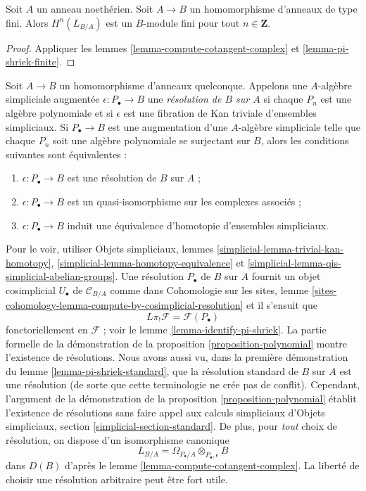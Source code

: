 \begin{lemma}
\label{lemma-cotangent-finite}
Soit $A$ un anneau noethérien. Soit $A \to B$ un homomorphisme d'anneaux de
type fini. Alors $H^n(L_{B/A})$ est un $B$-module fini pour tout
$n \in \mathbf{Z}$.
\end{lemma}

\begin{proof}
Appliquer les lemmes \ref{lemma-compute-cotangent-complex} et
\ref{lemma-pi-shriek-finite}.
\end{proof}

\begin{remark}[Resolutions]
\label{remark-resolution}
Soit $A \to B$ un homomorphisme d'anneaux quelconque. Appelons une
$A$-algèbre simpliciale augmentée $\epsilon : P_\bullet \to B$ une
{\it résolution de $B$ sur $A$} si chaque $P_n$ est une algèbre polynomiale
et si $\epsilon$ est une fibration de Kan triviale d'ensembles simpliciaux.
Si $P_\bullet \to B$ est une augmentation d'une $A$-algèbre simpliciale telle
que chaque $P_n$ soit une algèbre polynomiale se surjectant sur $B$, alors les
conditions suivantes sont équivalentes :
\begin{enumerate}
\item $\epsilon : P_\bullet \to B$ est une résolution de $B$ sur $A$ ;
\item $\epsilon : P_\bullet \to B$ est un quasi-isomorphisme sur les
complexes associés ;
\item $\epsilon : P_\bullet \to B$ induit une équivalence d'homotopie
d'ensembles simpliciaux.
\end{enumerate}
Pour le voir, utiliser Objets simpliciaux, lemmes
\ref{simplicial-lemma-trivial-kan-homotopy},
\ref{simplicial-lemma-homotopy-equivalence} et
\ref{simplicial-lemma-qis-simplicial-abelian-groups}.
Une résolution $P_\bullet$ de $B$ sur $A$ fournit un objet cosimplicial
$U_\bullet$ de $\mathcal{C}_{B/A}$ comme dans Cohomologie sur les sites, lemme
\ref{sites-cohomology-lemma-compute-by-cosimplicial-resolution}
et il s'ensuit que
$$
L\pi_!\mathcal{F} = \mathcal{F}(P_\bullet)
$$
fonctoriellement en $\mathcal{F}$ ; voir le lemme
\ref{lemma-identify-pi-shriek}. La partie formelle de la démonstration de la
proposition \ref{proposition-polynomial} montre l'existence de résolutions.
Nous avons aussi vu, dans la première démonstration du lemme
\ref{lemma-pi-shriek-standard}, que la résolution standard de $B$ sur $A$ est
une résolution (de sorte que cette terminologie ne crée pas de conflit).
Cependant, l'argument de la démonstration de la proposition
\ref{proposition-polynomial} établit l'existence de résolutions sans faire
appel aux calculs simpliciaux d'Objets simpliciaux, section
\ref{simplicial-section-standard}. De plus, pour {\it tout} choix de
résolution, on dispose d'un isomorphisme canonique
$$
L_{B/A} = \Omega_{P_\bullet/A} \otimes_{P_\bullet, \epsilon} B
$$
dans $D(B)$ d'après le lemme \ref{lemma-compute-cotangent-complex}. La liberté
de choisir une résolution arbitraire peut être fort utile.
\end{remark}

